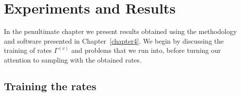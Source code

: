 \ifpdf
\graphicspath{{Chapter5/Figs/Raster/}{Chapter5/Figs/PDF/}{Chapter5/Figs/}}
\else
\graphicspath{{Chapter5/Figs/Vector/}{Chapter5/Figs/}}
\fi


\chapter{Experiments and Results}
\label{chapter5}
In the penultimate chapter we present results obtained using the methodology and software presented in Chapter~\ref{chapter4}. We begin by discussing the training of rates $\Gamma^{(v)}$ and problems that we run into, before turning our attention to sampling with the obtained rates.  

\section{Training the rates}
\label{sec:training_exp}

